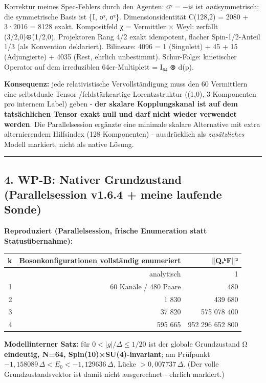 Korrektur meines Spec-Fehlers durch den Agenten: σʸ = −iε ist
\emph{anti}symmetrisch; die symmetrische Basis ist \{I, σˣ, σᶻ\}.
Dimensionsidentität C(128,2) = 2080 + 3·2016 = 8128 exakt. Kompositfeld
χ = Vermittler × Weyl: zerfällt (3/2,0)⊕\allowbreak{}(1/2,0), Projektoren Rang 4/2
exakt idempotent, flacher Spin-1/2-Anteil 1/3 (als Konvention
deklariert). Bilineare: 4096 = 1 (Singulett) + 45 + 15 (Adjungierte) +
4035 (Rest, ehrlich unbestimmt). Schur-Folge: kinetischer Operator auf
dem irreduziblen 64er-Multiplett = I₆₄ ⊗ d(p).

\textbf{Konsequenz:} jede relativistische Vervollständigung muss den 60
Vermittlern eine selbstduale Tensor-/feldstärkeartige Lorentzstruktur
((1,0), 3 Komponenten pro internem Label) geben - \textbf{der skalare
Kopplungskanal ist auf dem tatsächlichen Tensor exakt null und darf
nicht wieder verwendet werden}. Die Parallelsession ergänzte eine
minimale skalare Alternative mit extra alternierendem Hilfsindex (128
Komponenten) - ausdrücklich als \emph{zusätzliches} Modell markiert,
nicht als native Lösung.

\begin{center}\rule{0.5\linewidth}{0.5pt}\end{center}

\subsection{4. WP-B: Nativer Grundzustand (Parallelsession v1.6.4 +
meine laufende
Sonde)}\label{wp-b-nativer-grundzustand-parallelsession-v1.6.4-meine-laufende-sonde}

\textbf{Reproduziert (Parallelsession, frische Enumeration statt
Statusübernahme):}

{\def\LTcaptype{none} %
\begin{longtable}[]{@{}rrr@{}}
\toprule\noalign{}
k & Bosonkonfigurationen vollständig enumeriert & ‖Q₊ᵏF‖² \\
\midrule\noalign{}
\endhead
\bottomrule\noalign{}
\endlastfoot
0 & analytisch & 1 \\
1 & 60 Kanäle / 480 Paare & 480 \\
2 & 1 830 & 439 680 \\
3 & 37 820 & 575 078 400 \\
4 & 595 665 & 952 296 652 800 \\
\end{longtable}
}

\textbf{Modellinterner Satz:} für \(0<|g|/\Delta\le 1/20\) ist der
globale Grundzustand Ω \textbf{eindeutig, N=64,
Spin(10)×SU(4)-invariant}; am Prüfpunkt
\(-1{,}158089\,\Delta < E_0 < -1{,}129636\,\Delta\), Lücke
\(> 0{,}007737\,\Delta\). (Der volle Grundzustandsvektor ist damit nicht
ausgerechnet - ehrlich markiert.)

